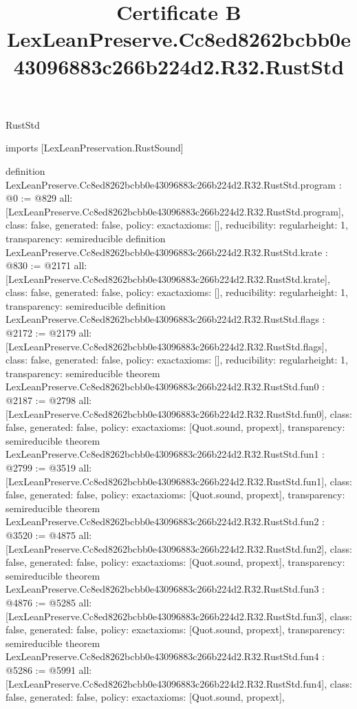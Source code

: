 \begin{lexlean}{RustStd}
\title{Certificate B LexLeanPreserve.Cc8ed8262bcbb0e43096883c266b224d2.R32.RustStd}
\begin{coremodule}
imports [LexLeanPreservation.RustSound]

definition LexLeanPreserve.Cc8ed8262bcbb0e43096883c266b224d2.R32.RustStd.program : @0 := @829 {
  all: [LexLeanPreserve.Cc8ed8262bcbb0e43096883c266b224d2.R32.RustStd.program],
  class: false,
  generated: false,
  policy: exact{axioms: []},
  reducibility: regular{height: 1},
  transparency: semireducible
}
definition LexLeanPreserve.Cc8ed8262bcbb0e43096883c266b224d2.R32.RustStd.krate : @830 := @2171 {
  all: [LexLeanPreserve.Cc8ed8262bcbb0e43096883c266b224d2.R32.RustStd.krate],
  class: false,
  generated: false,
  policy: exact{axioms: []},
  reducibility: regular{height: 1},
  transparency: semireducible
}
definition LexLeanPreserve.Cc8ed8262bcbb0e43096883c266b224d2.R32.RustStd.flags : @2172 := @2179 {
  all: [LexLeanPreserve.Cc8ed8262bcbb0e43096883c266b224d2.R32.RustStd.flags],
  class: false,
  generated: false,
  policy: exact{axioms: []},
  reducibility: regular{height: 1},
  transparency: semireducible
}
theorem LexLeanPreserve.Cc8ed8262bcbb0e43096883c266b224d2.R32.RustStd.fun0 : @2187 := @2798 {
  all: [LexLeanPreserve.Cc8ed8262bcbb0e43096883c266b224d2.R32.RustStd.fun0],
  class: false,
  generated: false,
  policy: exact{axioms: [Quot.sound, propext]},
  transparency: semireducible
}
theorem LexLeanPreserve.Cc8ed8262bcbb0e43096883c266b224d2.R32.RustStd.fun1 : @2799 := @3519 {
  all: [LexLeanPreserve.Cc8ed8262bcbb0e43096883c266b224d2.R32.RustStd.fun1],
  class: false,
  generated: false,
  policy: exact{axioms: [Quot.sound, propext]},
  transparency: semireducible
}
theorem LexLeanPreserve.Cc8ed8262bcbb0e43096883c266b224d2.R32.RustStd.fun2 : @3520 := @4875 {
  all: [LexLeanPreserve.Cc8ed8262bcbb0e43096883c266b224d2.R32.RustStd.fun2],
  class: false,
  generated: false,
  policy: exact{axioms: [Quot.sound, propext]},
  transparency: semireducible
}
theorem LexLeanPreserve.Cc8ed8262bcbb0e43096883c266b224d2.R32.RustStd.fun3 : @4876 := @5285 {
  all: [LexLeanPreserve.Cc8ed8262bcbb0e43096883c266b224d2.R32.RustStd.fun3],
  class: false,
  generated: false,
  policy: exact{axioms: [Quot.sound, propext]},
  transparency: semireducible
}
theorem LexLeanPreserve.Cc8ed8262bcbb0e43096883c266b224d2.R32.RustStd.fun4 : @5286 := @5991 {
  all: [LexLeanPreserve.Cc8ed8262bcbb0e43096883c266b224d2.R32.RustStd.fun4],
  class: false,
  generated: false,
  policy: exact{axioms: [Quot.sound, propext]},
}
\end{coremodule}
\end{lexlean}
